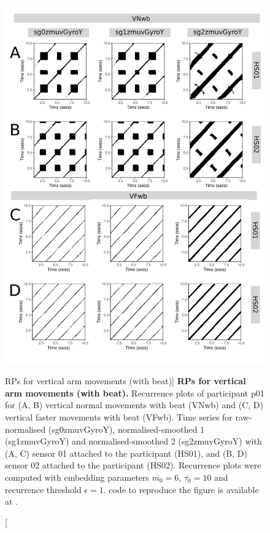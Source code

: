 \begin{figure}
\centering
\includegraphics[height=0.8\textheight]{fig_5_12}
\caption
	[RPs for vertical arm movements (with beat)]{
	{\bf RPs for vertical arm movements (with beat).}	
	Recurrence plots of participant p01 for 
	(A, B) vertical normal movements with beat (VNwb) and
	(C, D) vertical faster movements with beat (VFwb).
	Time series for raw-normalised (sg0zmuvGyroY), 
	normalised-smoothed 1 (sg1zmuvGyroY) and 
	normalised-smoothed 2 (sg2zmuvGyroY) with
	(A, C) sensor 01 attached to the participant (HS01), and
	(B, D) sensor 02 attached to the participant (HS02).
	Recurrence plots were computed with 
	embedding parameters $\overline{m_0}=6$, $\overline{\tau_0}=10$ and 
	recurrence threshold $\epsilon=1$.
	\R code to reproduce the figure is available at 
	.
        }
    \label{fig:rps_Vwb_w500}
\end{figure}

